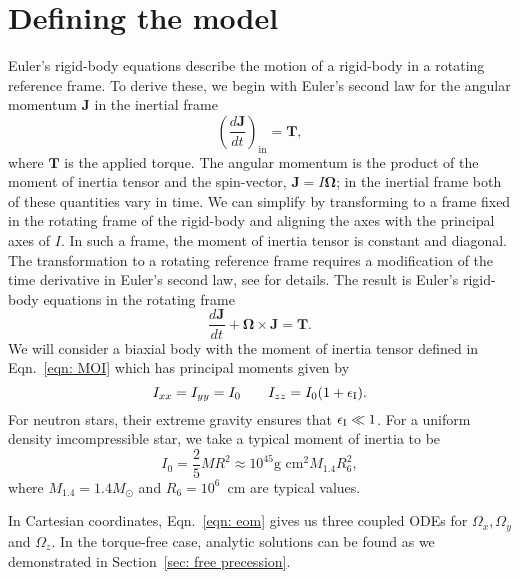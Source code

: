\documentclass[../full_thesis/full_thesis.tex]{subfiles}
\begin{document}
\section{Defining the model}
\label{sec: defining the model}

Euler's rigid-body equations describe the motion of a rigid-body in a rotating
reference frame. To derive these, we begin with Euler's second law for the
angular momentum $\mathbf{J}$ in the inertial frame
\begin{equation}
    \left(\frac{d\mathbf{J}}{dt}\right)_{\textrm{in}}=\mathbf{T},
\end{equation}
where $\mathbf{T}$ is the applied torque. The angular momentum is the product
of the moment of inertia tensor and the spin-vector, $\mathbf{J}=I \mathbf{\Omega}$; in the inertial
frame both of these quantities vary in time. We can simplify by
transforming to a frame fixed in the rotating frame of the rigid-body and
aligning the axes with the principal axes of $I$. In such a frame, the moment
of inertia tensor is constant and diagonal. The transformation to a rotating reference
frame requires a modification of the time derivative in Euler's second law, see
\citet{Landau1969} for details. The result is Euler's rigid-body equations in
the rotating frame
\begin{equation}
    \frac{d\mathbf{J}}{dt} + \mathbf{\Omega} \times \mathbf{J} = \mathbf{T}.
    \label{eqn: eom}
\end{equation}
We will consider a biaxial body with the moment  of inertia tensor
defined in Eqn.~\eqref{eqn: MOI} which has principal moments given by
\begin{equation}
I_{xx} = I_{yy} = I_{0} \;\;\;\;\;\;\; I_{zz} = I_{0}(1+\epsilon_{\mathrm{I}}).
\end{equation}
For neutron stars, their extreme gravity ensures that $\epsilon_{\mathrm{I}} \ll 1$. For
a uniform density imcompressible star, we take a typical moment of inertia to be
\begin{equation}
I_{0} = \frac{2}{5}MR^{2} \approx 10^{45}\textrm{g cm}^{2} M_{1.4}R_6^{2},
\end{equation}
where $M_{1.4} = 1.4 M_{\odot}$ and $R_6=10^{6}$~cm are typical values.

In Cartesian coordinates, Eqn.~\ref{eqn: eom} gives us three coupled ODEs
for $\Omega_{x}, \Omega_{y}$ and $\Omega_{z}$. In the torque-free case, analytic
solutions can be found as we demonstrated in Section~\ref{sec: free precession}.
\end{document}
